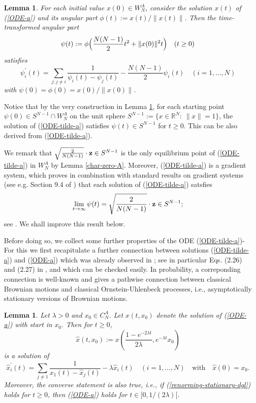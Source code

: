 \documentclass[reqno]{amsart}
\theoremstyle{plain}
\newtheorem{lemma}[theorem]{Lemma}
\theoremstyle{definition}
\numberwithin{equation}{section}
\begin{document}
\begin{lemma}\label{stabilily-lemma1}
  For each initial value $x(0)\in W_N^A $, consider the solution $x(t)$  of (\ref{ODE-a}) and its angular part
  $\phi(t):=x(t)/\|x(t)\|$.
  Then the time-transformed angular part
  \begin{equation}\label{time-transform-a}
    \psi(t) := \phi\Bigl( \frac{ N(N-1)}{2}t^2+ \|x(0)\|^2t \Bigr) \quad(t\ge0)
    \end{equation}
satisfies
\begin{equation}\label{ODE-tilde-a}
{\psi}_i^\prime(t) = \sum_{j: j\ne i}  \frac{1}{\psi_{i}(t)-\psi_{j}(t)}
-\frac{ N(N-1)}{2} \psi_{i}(t)\quad(i=1,\ldots,N)
\end{equation}
with $\psi(0)=\phi(0)=x(0)/\|x(0)\|$.
\end{lemma}

Notice that by the very construction in Lemma \ref{stabilily-lemma1},
for each starting point $\psi(0)\in S^{N-1}\cap  W_N^A$ on the unit sphere
$ S^{N-1}:=\{x\in\mathbb R^N:\> \|x\|=1\}$, the solution of (\ref{ODE-tilde-a}) satisfies 
$\psi(t)\in S^{N-1}$ for  $t\ge0$. This can be also derived from (\ref{ODE-tilde-a}).


We  remark that $\sqrt{\frac{2}{N(N-1)}}\cdot  {\bf z }\in  S^{N-1}$ is the only
equilibrium point of (\ref{ODE-tilde-a})
  in  $W_N^A$ by Lemma \ref{char-zero-A}. Moreover,
(\ref{ODE-tilde-a}) is a gradient system, which proves in combination with standard results on gradient systems
(see e.g. Section 9.4 of \cite{HS}) that each solution of (\ref{ODE-tilde-a})
satsfies
$$\lim_{t\to\infty} \psi(t) = \sqrt{\frac{2}{N(N-1)}}\cdot  {\bf z }\in  S^{N-1};$$
see \cite{VW3}.
We shall improve this result below.

Before doing so, we collect some further properties of the ODE (\ref{ODE-tilde-a})-
For this we first recapitulate a further connection between solutions (\ref{ODE-tilde-a}) and  (\ref{ODE-a})
which was already observed in \cite{VW1, VW2}; see in particular Eqs. (2.26) and  (2.27) in \cite{VW2},
and which can be checked easily.
In probability, a correponding connection is well-known and gives
  a pathwise connection between  classical Brownian motions and classical Ornstein-Uhlenbeck processes, i.e.,
  asymptotically stationary versions  of Brownian motions.


  \begin{lemma}\label{connection-odes2-a}
Let $\lambda>0$ and $x_0\in C_N^A$. Let $x(t,x_0)$ denote the  solution of  (\ref{ODE-a}) with start in $x_0$.
Then for $t\ge0$,
   \begin{equation}\label{renorming-stationary}
\hat x(t,x_0):=      x(\frac{1-e^{-2\lambda t}}{2\lambda}, e^{-\lambda t}x_0)
\end{equation}
is a solution of 
\begin{equation}\label{renorming-stationary-dgl}
  \hat x_i^\prime(t) =\sum_{j\ne1} \frac{1}{ \hat x_1(t)- \hat x_j(t)} 
-\lambda \hat  x_i(t) \quad (i=1,\ldots,N) \quad\text{with}\quad  \hat x(0)=x_0 .
\end{equation}
Moreover, the converse statement is also true, i.e., if (\ref{renorming-stationary-dgl}) holds for $t\ge0$, then
(\ref{ODE-a}) holds for $t\in[0,1/(2\lambda)[$.
  \end{lemma}
\end{document}
